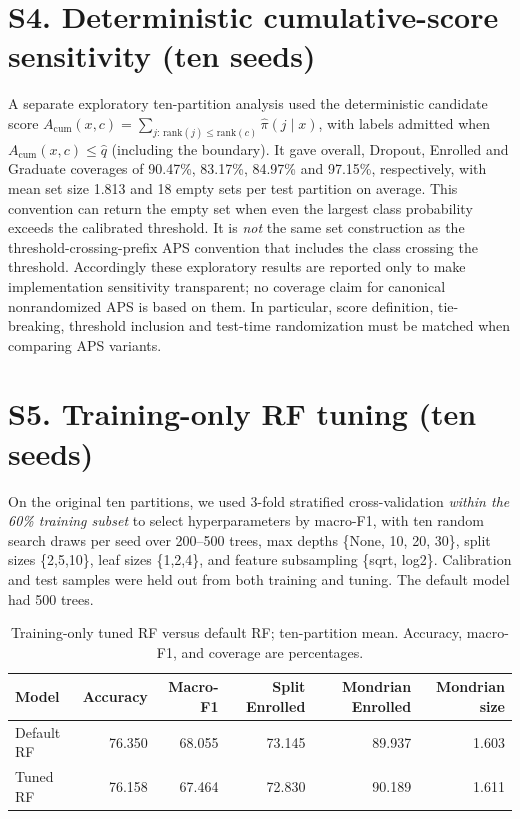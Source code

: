 \section*{S4. Deterministic cumulative-score sensitivity (ten seeds)}
A separate exploratory ten-partition analysis used the deterministic
candidate score $A_{\mathrm{cum}}(x,c)=\sum_{j:\,\mathrm{rank}(j)\le
\mathrm{rank}(c)}\hat\pi(j\mid x)$, with labels admitted when
$A_{\mathrm{cum}}(x,c)\le\hat q$ (including the boundary). It gave overall,
\textsf{Dropout}, \textsf{Enrolled} and \textsf{Graduate} coverages of
90.47\%, 83.17\%, 84.97\% and 97.15\%, respectively, with mean set size
1.813 and 18 empty sets per test partition on average. This convention can
return the empty set when even the largest class probability exceeds the
calibrated threshold. It is \emph{not} the same set construction as the
threshold-crossing-prefix APS convention that includes the class crossing the
threshold. Accordingly these exploratory results are reported only to make
implementation sensitivity transparent; no coverage claim for canonical
nonrandomized APS is based on them. In particular, score definition,
tie-breaking, threshold inclusion and test-time randomization must be matched
when comparing APS variants.


\section*{S5. Training-only RF tuning (ten seeds)}


On the original ten partitions, we used 3-fold stratified cross-validation
\emph{within the 60\% training subset} to select hyperparameters by macro-F1,
with ten random search draws per seed over 200--500 trees, max depths
\{None, 10, 20, 30\}, split sizes \{2,5,10\}, leaf sizes \{1,2,4\},
and feature subsampling \{sqrt, log2\}. Calibration and test samples were
held out from both training and tuning. The default model had 500 trees.

\begin{table}[htbp]
\centering\small
\caption{Training-only tuned RF versus default RF; ten-partition mean.
Accuracy, macro-F1, and coverage are percentages.}
\label{tab:tuned}
\begin{tabular}{lrrrrr}
\toprule Model & Accuracy & Macro-F1 & Split Enrolled & Mondrian Enrolled & Mondrian size\\
\midrule
Default RF & 76.350 & 68.055 & 73.145 & 89.937 & 1.603\\
Tuned RF & 76.158 & 67.464 & 72.830 & 90.189 & 1.611\\
\bottomrule
\end{tabular}
\end{table}

